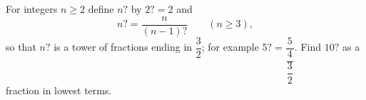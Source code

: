 For integers $n\ge2$ define $n?$ by $2?=2$ and
\[
n?=\dfrac{n}{(n-1)?}\qquad(n\ge3),
\]
so that $n?$ is a tower of fractions ending in $\dfrac{3}{2}$; for example $5?=\dfrac{5}{\dfrac{4}{\dfrac{3}{2}}}$. Find $10?$ as a fraction in lowest terms.
